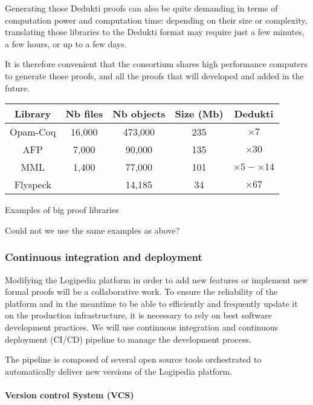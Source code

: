 Generating those Dedukti proofs can also be quite demanding in terms
of computation power and computation time: depending on their size or
complexity, translating those libraries to the Dedukti format may
require just a few minutes, a few hours, or up to a few days.

It is therefore convenient that the consortium shares high performance
computers to generate those proofs, and all the proofs that will
developed and added in the future.

\begin{center}
\begin{tabular}{|c|c|c|c|c|}\hline
Library & Nb files & Nb objects & Size (Mb) & Dedukti\\\hline
Opam-Coq & 16,000 & 473,000 & 235 & $\times 7$\\\hline
AFP & 7,000 & 90,000 & 135 & $\times 30$\\\hline
MML & 1,400 & 77,000 & 101 & $\times 5-\times 14$\\\hline
Flyspeck & & 14,185 & 34 & $\times 67$\\\hline
\end{tabular}

\medskip

Examples of big proof libraries
\end{center}

{\color{red} Could not we use the same examples as above?}

\subsubsection*{Continuous integration and deployment}
Modifying the Logipedia platform in order to add new features or implement
new formal proofs will be a collaborative work. To ensure the reliability
of the platform and in the meantime to be able to efficiently and
frequently update it on the production infrastructure,
it is necessary to rely on best software development practices.
We will use continuous integration and continuous deployment (CI/CD)
pipeline to manage the development process.

The pipeline is composed of several open source tools orchestrated
to automatically deliver new versions of the Logipedia platform.

\paragraph*{Version control System (VCS)}

